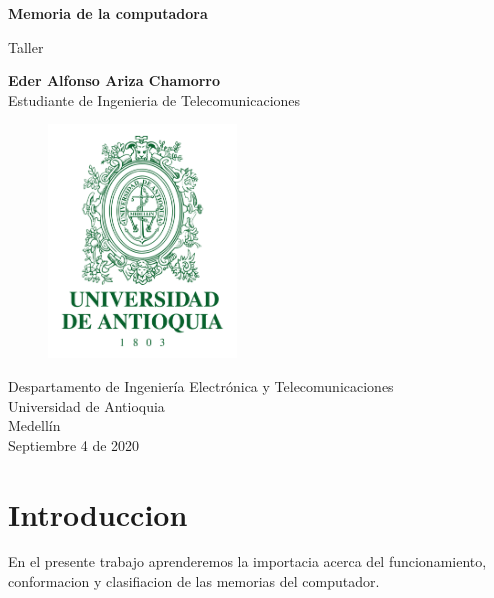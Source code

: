\documentclass{article}
\begin{document}
\begin{titlepage}
	
    \begin{center}
	
		\vspace*{1cm}
	
		\Huge
		\textbf{Memoria de la computadora}
	
		\vspace{0.5cm}
	
		\LARGE
		Taller
	
		\vspace{0.5cm}
	
		\LARGE
		\textbf{Eder Alfonso Ariza Chamorro}\\
		Estudiante de Ingenieria de Telecomunicaciones\\
	
		\vspace*{1.5cm}
	
		\begin{figure}[h]
			\includegraphics[width=5cm]{Logo UdeA.png}
			\centering
			\label{fig:Logo UdeA}
		\end{figure}
	
		\vspace*{2cm}
	
		\Large
		Despartamento de Ingeniería Electrónica y Telecomunicaciones\\
		Universidad de Antioquia\\
		Medellín\\
		Septiembre 4 de 2020
	
	\end{center}

\end{titlepage}

\tableofcontents
\newpage


\section{Introduccion}\label{intro}
En el presente trabajo aprenderemos la importacia acerca del funcionamiento, conformacion y clasifiacion de las memorias del computador.\\
\end{document}
